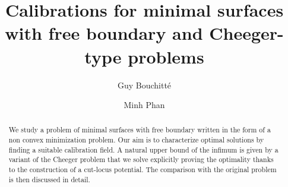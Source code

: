 \documentclass[reqno,11pt]{amsart}
\date{}
\theoremstyle{definition}
\numberwithin{equation}{section}
\newcommand{\1}{{{\bf 1}\kern-0,28em\rm l}}
\begin{document}

\title[Calibrations for free boundary and Cheeger-type problems] {Calibrations  for minimal surfaces with free boundary and Cheeger-type problems}

\medskip




\author[G.~Bouchitt\'e, Minh.~Phan]{Guy Bouchitt\'e\and  Minh Phan}
\address[Guy Bouchitt\'e]{UFR des Sciences et Techniques\\ Universit\'e de Toulon et du Var, BP 132\\ 83957 La Gard Cedex (France)
}

\address[Minh  Phan]{ The University of Danang - University of Science and Education, Da Nang 550000, (Viet Nam)}

\begin{abstract}
We study a problem of minimal surfaces with free boundary  written in  the form of a non convex minimization problem. 
Our aim is to characterize  optimal solutions by finding a suitable calibration field. A natural upper bound of the infimum is given by a variant of the Cheeger problem that we solve explicitly proving the optimality  thanks to the construction of a cut-locus potential. The comparison with the original problem is then discussed in detail.
\end{abstract}



\maketitle
\end{document}
